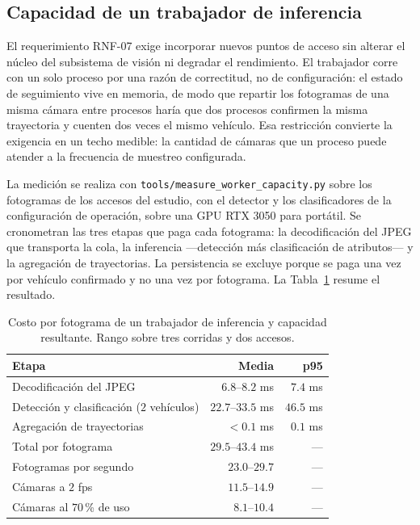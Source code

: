 \subsection{Capacidad de un trabajador de inferencia}
\label{subsec:capacidad}

El requerimiento RNF-07 exige incorporar nuevos puntos de acceso sin alterar el
núcleo del subsistema de visión ni degradar el rendimiento. El trabajador corre
con un solo proceso por una razón de correctitud, no de configuración: el estado
de seguimiento vive en memoria, de modo que repartir los fotogramas de una misma
cámara entre procesos haría que dos procesos confirmen la misma trayectoria y
cuenten dos veces el mismo vehículo. Esa restricción convierte la exigencia en un
techo medible: la cantidad de cámaras que un proceso puede atender a la frecuencia
de muestreo configurada.

La medición se realiza con \texttt{tools/measure\_worker\_capacity.py} sobre los
fotogramas de los accesos del estudio, con el detector y los clasificadores de la
configuración de operación, sobre una GPU RTX 3050 para portátil. Se cronometran
las tres etapas que paga cada fotograma: la decodificación del JPEG que transporta
la cola, la inferencia ---detección más clasificación de atributos--- y la
agregación de trayectorias. La persistencia se excluye porque se paga una vez por
vehículo confirmado y no una vez por fotograma. La Tabla~\ref{tab:capacidad}
resume el resultado.

\begin{table}[H]
    \centering
    \caption{Costo por fotograma de un trabajador de inferencia y capacidad
    resultante. Rango sobre tres corridas y dos accesos.}
    \label{tab:capacidad}
    \begin{tabular}{lrr}
        \toprule
        \textbf{Etapa} & \textbf{Media} & \textbf{p95} \\
        \midrule
        Decodificación del JPEG        & $6{.}8$--$8{.}2$ ms & $7{.}4$ ms \\
        Detección y clasificación ($2$ vehículos) & $22{.}7$--$33{.}5$ ms & $46{.}5$ ms \\
        Agregación de trayectorias     & $<0{.}1$ ms & $0{.}1$ ms \\
        \midrule
        Total por fotograma            & $29{.}5$--$43{.}4$ ms & --- \\
        Fotogramas por segundo         & $23{.}0$--$29{.}7$ & --- \\
        Cámaras a $2$ fps              & $11{.}5$--$14{.}9$ & --- \\
        Cámaras al $70$\,\% de uso   & $8{.}1$--$10{.}4$ & --- \\
        \bottomrule
    \end{tabular}
\end{table}

